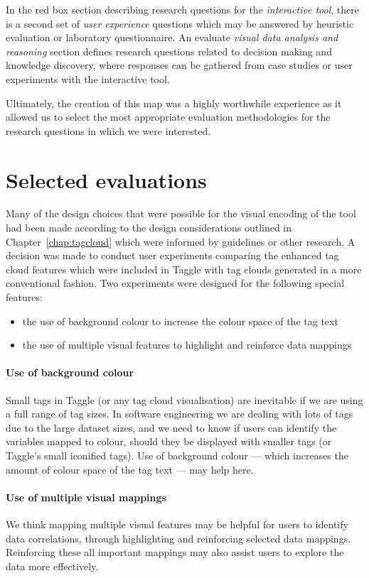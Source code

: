 In the red box section describing research questions for the \emph{interactive tool}, there is a second set of \emph{user experience} questions which may be answered by heuristic evaluation or laboratory questionnaire. An evaluate \emph{visual data analysis and reasoning} section defines research questions related to decision making and knowledge discovery, where responses can be gathered from case studies or user experiments with the interactive tool.

Ultimately, the creation of this map was a highly worthwhile experience as it allowed us to select the most appropriate evaluation methodologies for the research questions in which we were interested. 

\section{Selected evaluations}\label{sect:evals}

Many of the design choices that were possible for the visual encoding of the tool had been made according to the design considerations outlined in Chapter~\ref{chap:tagcloud} which were informed by guidelines or other research. A decision was made to conduct user experiments comparing the enhanced tag cloud features which were included in Taggle with tag clouds generated in a more conventional fashion. Two experiments were designed for the following special features:

\begin{itemize}
\item the use of background colour to increase the colour space of the tag text
\item the use of multiple visual features to highlight and reinforce data mappings 
\end{itemize}

\paragraph{Use of background colour} Small tags in Taggle (or any tag cloud visualisation) are inevitable if we are using a full range of tag sizes. In software engineering we are dealing with lots of tags due to the large dataset sizes, and we need to know if users can identify the variables mapped to colour, should they be displayed with smaller tags (or Taggle's small iconified tags). Use of background colour --- which increases the amount of colour space of the tag text --- may help here. 

\paragraph{Use of multiple visual mappings} We think mapping multiple visual features may be helpful for users to identify data correlations, through highlighting and reinforcing selected data mappings. Reinforcing these all important mappings may also assist users to explore the data more effectively. 

